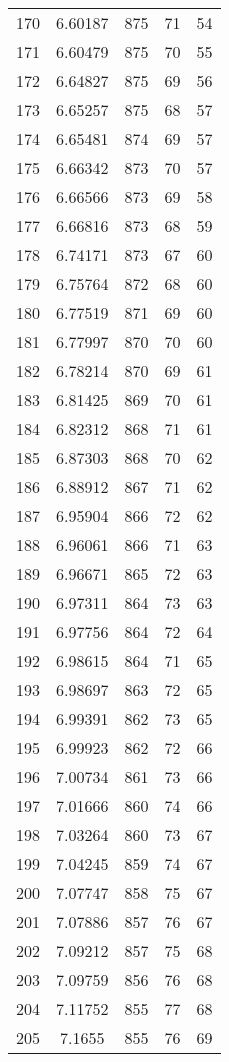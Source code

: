 \documentclass[12pt,a4paper]{article}
\begin{document}
\begin{tabular}{r|cccc}
	170 & 6.60187 & 875 & 71 & 54 \\
	171 & 6.60479 & 875 & 70 & 55 \\
	172 & 6.64827 & 875 & 69 & 56 \\
	173 & 6.65257 & 875 & 68 & 57 \\
	174 & 6.65481 & 874 & 69 & 57 \\
	175 & 6.66342 & 873 & 70 & 57 \\
	176 & 6.66566 & 873 & 69 & 58 \\
	177 & 6.66816 & 873 & 68 & 59 \\
	178 & 6.74171 & 873 & 67 & 60 \\
	179 & 6.75764 & 872 & 68 & 60 \\
	180 & 6.77519 & 871 & 69 & 60 \\
	181 & 6.77997 & 870 & 70 & 60 \\
	182 & 6.78214 & 870 & 69 & 61 \\
	183 & 6.81425 & 869 & 70 & 61 \\
	184 & 6.82312 & 868 & 71 & 61 \\
	185 & 6.87303 & 868 & 70 & 62 \\
	186 & 6.88912 & 867 & 71 & 62 \\
	187 & 6.95904 & 866 & 72 & 62 \\
	188 & 6.96061 & 866 & 71 & 63 \\
	189 & 6.96671 & 865 & 72 & 63 \\
	190 & 6.97311 & 864 & 73 & 63 \\
	191 & 6.97756 & 864 & 72 & 64 \\
	192 & 6.98615 & 864 & 71 & 65 \\
	193 & 6.98697 & 863 & 72 & 65 \\
	194 & 6.99391 & 862 & 73 & 65 \\
	195 & 6.99923 & 862 & 72 & 66 \\
	196 & 7.00734 & 861 & 73 & 66 \\
	197 & 7.01666 & 860 & 74 & 66 \\
	198 & 7.03264 & 860 & 73 & 67 \\
	199 & 7.04245 & 859 & 74 & 67 \\
	200 & 7.07747 & 858 & 75 & 67 \\
	201 & 7.07886 & 857 & 76 & 67 \\
	202 & 7.09212 & 857 & 75 & 68 \\
	203 & 7.09759 & 856 & 76 & 68 \\
	204 & 7.11752 & 855 & 77 & 68 \\
	205 & 7.1655 & 855 & 76 & 69 \\

\end{tabular}
\end{document}
